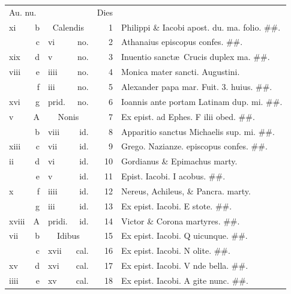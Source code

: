\documentclass[a5paper,10pt]{book}
\def\ae{æ}
\begin{document}
\begin{center}
\begin{tabular}{l r l r r l}
\multicolumn{2}{l}{\color{red}Au. nu.} & & & \color{red} Dies & \\
xi & b & \multicolumn{2}{c}{\color{red} Calendis} & 1 & \color{red} Philippi \& Iacobi apost. du. ma. \color{black} folio. \#\#.\\
 & c & vi & no. & 2 & Athanaius episcopus confes. \color{black} \#\#.\\
xix & d & v & no. & 3 & \color{red} Inuentio sanct\ae \ Crucis duplex ma. \color{black} \#\#.\\%
viii & e & iiii & no. & 4 & Monica mater sancti. Augustini. \color{black} \\
 & f & iii & no. & 5 & Alexander papa mar. \color{red} Fuit. 3. huius. \color{black} \#\#.\\
xvi & g & \color{red} prid. & \color{red} no. & 6 & \color{red} Ioannis ante portam Latinam dup. mi. \color{black} \#\#.\\
v & \color{red} A & \multicolumn{2}{c}{\color{red} Nonis} & 7 & Ex epist. ad Ephes. \color{red} F\color{black} ilii obed. \#\#.\\
 & b & viii & id. & 8 & \color{red} Apparitio sanctus Michaelis sup. mi. \color{black} \#\#.\\%
xiii & c & vii & id. & 9 & Grego. Nazianze. episcopus confes. \color{black} \#\#.\\
ii & d & vi & id. & 10 & Gordianus \& Epimachus marty. \color{black}\\
 & e & v & id. & 11 & Epist. Iacobi. \color{red} I\color{black} acobus. \#\#.\\
x & f & iiii & id. & 12 & Nereus, Achileus, \& Pancra. marty. \color{black}\\
 & g & iii & id. & 13 & Ex epist. Iacobi. \color{red} E\color{black} stote. \#\#.\\
xviii & \color{red} A & \color{red} pridi. & id. & 14 & Victor \& Corona martyres. \#\#.\\
vii & b & \multicolumn{2}{c}{\color{red} Idibus} & 15 & Ex epist. Iacobi. \color{red} Q\color{black} uicunque. \#\#.\\
 & c & xvii & cal. & 16 & Ex epist. Iacobi. \color{red} N\color{black} olite. \#\#.\\
xv & d & xvi & cal. & 17 & Ex epist. Iacobi. \color{red} V\color{black} nde bella. \#\#.\\
iiii & e & xv & cal. & 18 & Ex epist. Iacobi. \color{red} A\color{black} gite nunc. \#\#.\\

\end{tabular}
\end{center}
\end{document}
